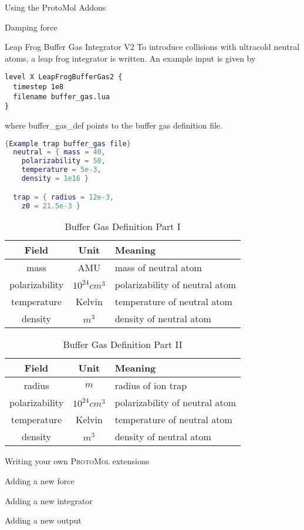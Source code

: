 \documentclass{article}
\begin{document}
\begin{section} {Using the ProtoMol Addons}
\begin{subsection} {Damping force}
\end{subsection}

\begin{subsection} {Leap Frog Buffer Gas Integrator V2}
To introduce collisions with ultracold neutral atoms, a leap frog integrator is written. An example input is given by
\begin{lstlisting}
level X LeapFrogBufferGas2 {
  timestep 1e8
  filename buffer_gas.lua
}
\end{lstlisting}
where buffer\_gas\_def points to the buffer gas definition file.
\begin{lstlisting}[language=LUA]{Example trap buffer_gas file}
  neutral = { mass = 40,
    polarizability = 50,
    temperature = 5e-3,
    density = 1e16 }

  trap = { radius = 12e-3, 
    z0 = 21.5e-3 }
\end{lstlisting}


\begin{table}[h!]
  \centering
  \begin{tabular}{ c  c  l } \toprule
    Field & Unit & Meaning\\ \midrule
    mass & AMU & mass of neutral atom \\
    polarizability & $10^{24} cm^3$ & polarizability of neutral atom \\
    temperature & Kelvin & temperature of neutral atom \\
    density & $m^3$ & density of neutral atom
  \end{tabular}
  \caption{Buffer Gas Definition Part I}
  \label{tab:leapfrogintegrator_def_p1}
\end{table}

\begin{table}[h!]
  \centering
  \begin{tabular}{ c  c  l } \toprule
    Field & Unit & Meaning\\ \midrule
    radius & $m$ & radius of ion trap \\
    polarizability & $10^{24} cm^3$ & polarizability of neutral atom \\
    temperature & Kelvin & temperature of neutral atom \\
    density & $m^3$ & density of neutral atom
  \end{tabular}
  \caption{Buffer Gas Definition Part II}
  \label{tab:leapfrogintegrator_def_p2}
\end{table}
\end{subsection}

\end{section}

\begin{section} {Writing your own \textsc{ProtoMol} extensions}
\begin{subsection} {Adding a new force}
  
\end{subsection}

\begin{subsection} {Adding a new integrator}
  
\end{subsection}

\begin{subsection} {Adding a new output}
  
\end{subsection}



\end{section}
\end{document}
